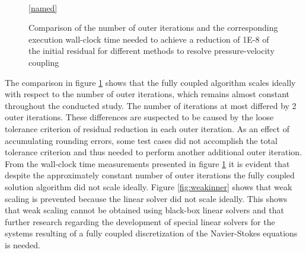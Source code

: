 \begin{figure}[h!]
  \begin{center}
    \\
  \ref{named}
  \end{center}
  \caption{Comparison of the number of outer iterations and the corresponding execution wall-clock time needed to achieve a reduction of 1E-8 of the initial residual for different methods to resolve pressure-velocity coupling}
  \label{fig:weak}
\end{figure}

The comparison in figure \ref{fig:weak} shows that the fully coupled algorithm scales ideally with respect to the number of outer iterations, which remains almost constant throughout the conducted study. The number of iterations at most differed by 2 outer iterations. These differences are suspected to be caused by the loose tolerance criterion of residual reduction in each outer iteration. As an effect of accumulating rounding errors, some test cases did not accomplish the total tolerance criterion and thus needed to perform another additional outer iteration. From the wall-clock time measurements presented in figure \ref{fig:weak} it is evident that despite the approximately constant number of outer iterations the fully coupled solution algorithm did not scale ideally. Figure \ref{fig:weakinner} shows that weak scaling is prevented because the linear solver did not scale ideally. This shows that weak scaling cannot be obtained using black-box linear solvers and that further research regarding the development of special linear solvers for the systems resulting of a fully coupled discretization of the Navier-Stokes equations is needed.


